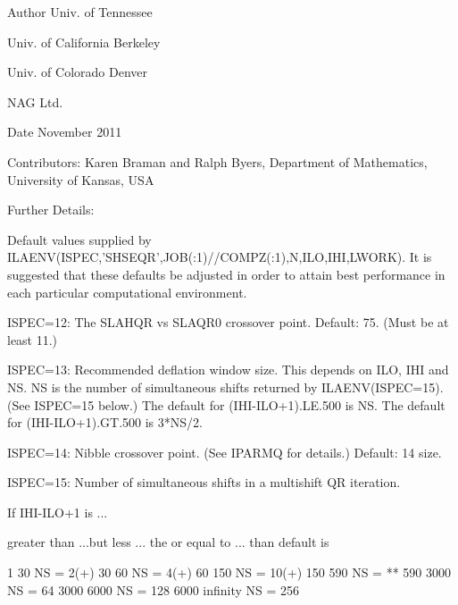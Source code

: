 \begin{DoxyAuthor}{Author}
Univ. of Tennessee 

Univ. of California Berkeley 

Univ. of Colorado Denver 

N\+A\+G Ltd. 
\end{DoxyAuthor}
\begin{DoxyDate}{Date}
November 2011 
\end{DoxyDate}
\begin{DoxyParagraph}{Contributors\+: }
Karen Braman and Ralph Byers, Department of Mathematics, University of Kansas, U\+S\+A 
\end{DoxyParagraph}
\begin{DoxyParagraph}{Further Details\+: }
\begin{DoxyVerb}             Default values supplied by
             ILAENV(ISPEC,'SHSEQR',JOB(:1)//COMPZ(:1),N,ILO,IHI,LWORK).
             It is suggested that these defaults be adjusted in order
             to attain best performance in each particular
             computational environment.

            ISPEC=12: The SLAHQR vs SLAQR0 crossover point.
                      Default: 75. (Must be at least 11.)

            ISPEC=13: Recommended deflation window size.
                      This depends on ILO, IHI and NS.  NS is the
                      number of simultaneous shifts returned
                      by ILAENV(ISPEC=15).  (See ISPEC=15 below.)
                      The default for (IHI-ILO+1).LE.500 is NS.
                      The default for (IHI-ILO+1).GT.500 is 3*NS/2.

            ISPEC=14: Nibble crossover point. (See IPARMQ for
                      details.)  Default: 14%
                      size.

            ISPEC=15: Number of simultaneous shifts in a multishift
                      QR iteration.

                      If IHI-ILO+1 is ...

                      greater than      ...but less    ... the
                      or equal to ...      than        default is

                           1               30          NS =   2(+)
                          30               60          NS =   4(+)
                          60              150          NS =  10(+)
                         150              590          NS =  **
                         590             3000          NS =  64
                        3000             6000          NS = 128
                        6000             infinity      NS = 256


\end{DoxyVerb}
\end{DoxyParagraph}
